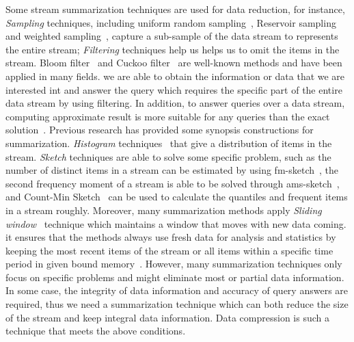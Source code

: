 Some stream summarization techniques are used for data reduction, for instance,
\emph{Sampling} techniques, including uniform random
sampling~\cite{vitter1984faster, Ahrens1985SequentialRS}, Reservoir
sampling~\cite{vitter1985random, Aggarwal2007DataS} and weighted
sampling~\cite{chaudhuri1999random, efraimidis2006weighted}, capture a
sub-sample of the data stream to represents the entire stream; \emph{Filtering}
techniques help us helps us to omit the items in the stream. Bloom
filter~\cite{bloom1970space} and Cuckoo filter~\cite{fan2014cuckoo} are
well-known methods and have been applied in many fields. we are able to obtain
the information or data that we are interested int and answer the query which
requires the specific part of the entire data stream by using filtering. In
addition, to  answer queries over a data stream, computing approximate result is
more suitable for any queries than the exact solution~\cite{kejariwal2015real}.
Previous research has provided some synopsis constructions for summarization.
\emph{Histogram} techniques~\cite{kejariwal2015real, ahmed2019data} that give a
distribution of items in the stream. \emph{Sketch} techniques are able to solve
some specific problem, such as the number of distinct items in a stream can be
estimated by using \acrfull{fm-sketch}~\cite{flajolet1985probabilistic,
garofalakis2016data}, the second frequency moment of a stream is able to be solved
through \acrfull{ams-sketch}~\cite{alon1999space}, and Count-Min
Sketch~\cite{cormode2005improved, garofalakis2016data} can be used to calculate
the quantiles and frequent items in a stream roughly. Moreover, many summarization
methods apply \emph{Sliding window}~\cite{datar2002maintaining} technique
which maintains a window that moves with new data coming. it ensures that the
methods always use fresh data for analysis and statistics by keeping the most
recent items of the stream or all items within a specific time period in given bound
memory~\cite{leskovec2014mining}. However, many summarization techniques only
focus on specific problems and might eliminate most or partial data
information. In some case, the integrity of data information and accuracy of
query answers are required, thus we need a summarization technique which can
both reduce the size of the stream and keep integral data information. Data compression
is such a technique that meets the above conditions.


